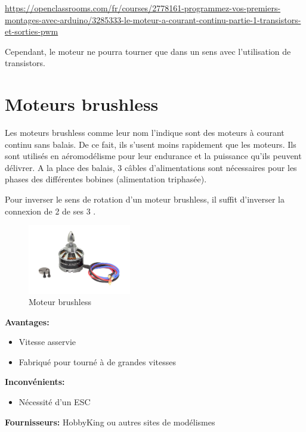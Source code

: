\documentclass[a4paper, 11pt]{report}
\begin{document}
\url{https://openclassrooms.com/fr/courses/2778161-programmez-vos-premiers-montages-avec-arduino/3285333-le-moteur-a-courant-continu-partie-1-transistors-et-sorties-pwm}

Cependant, le moteur ne pourra tourner que dans un sens avec l'utilisation de transistors.

\section{Moteurs brushless}
Les moteurs brushless comme leur nom l'indique sont des moteurs à courant continu sans balais. De ce fait, ils s'usent moins rapidement que les moteurs. Ils sont  utilisés en aéromodélisme pour leur endurance et la puissance qu'ils peuvent délivrer. A la place des balais, 3 câbles d'alimentations sont nécessaires pour les phases des différentes bobines (alimentation triphasée).

Pour inverser le sens de rotation d'un moteur brushless, il suffit d'inverser la connexion de 2 de ses 3 .

\begin{figure}[h!]
\begin{centering}
\includegraphics[width=0.4\textwidth]{images/MoteurBrushless.jpg}
\caption{Moteur brushless}
\par\end{centering}
\end{figure}

\textbf{Avantages:}
\begin{itemize}
\item Vitesse asservie
\item Fabriqué pour tourné à de grandes vitesses
\end{itemize}

\textbf{Inconvénients:}
\begin{itemize}
\item Nécessité d'un ESC
\end{itemize}

\textbf{Fournisseurs:} HobbyKing ou autres sites de modélismes
\end{document}
